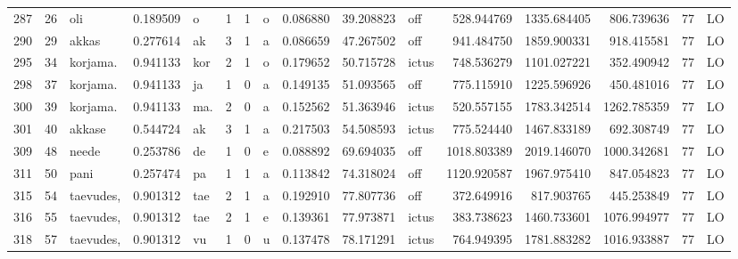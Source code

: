 \begin{tabular}{lrlrllllrrlrrrll}
287  &          26 &              oli &  0.189509 &       o &        1 &      1 &       o &      0.086880 &     39.208823 &    off &   528.944769 &  1335.684405 &   806.739636 &     77 &        LO \\
290  &          29 &            akkas &  0.277614 &      ak &        3 &      1 &       a &      0.086659 &     47.267502 &    off &   941.484750 &  1859.900331 &   918.415581 &     77 &        LO \\
295  &          34 &         korjama. &  0.941133 &     kor &        2 &      1 &       o &      0.179652 &     50.715728 &  ictus &   748.536279 &  1101.027221 &   352.490942 &     77 &        LO \\
298  &          37 &         korjama. &  0.941133 &      ja &        1 &      0 &       a &      0.149135 &     51.093565 &    off &   775.115910 &  1225.596926 &   450.481016 &     77 &        LO \\
300  &          39 &         korjama. &  0.941133 &     ma. &        2 &      0 &       a &      0.152562 &     51.363946 &  ictus &   520.557155 &  1783.342514 &  1262.785359 &     77 &        LO \\
301  &          40 &           akkase &  0.544724 &      ak &        3 &      1 &       a &      0.217503 &     54.508593 &  ictus &   775.524440 &  1467.833189 &   692.308749 &     77 &        LO \\
309  &          48 &            neede &  0.253786 &      de &        1 &      0 &       e &      0.088892 &     69.694035 &    off &  1018.803389 &  2019.146070 &  1000.342681 &     77 &        LO \\
311  &          50 &             pani &  0.257474 &      pa &        1 &      1 &       a &      0.113842 &     74.318024 &    off &  1120.920587 &  1967.975410 &   847.054823 &     77 &        LO \\
315  &          54 &        taevudes, &  0.901312 &     tae &        2 &      1 &       a &      0.192910 &     77.807736 &    off &   372.649916 &   817.903765 &   445.253849 &     77 &        LO \\
316  &          55 &        taevudes, &  0.901312 &     tae &        2 &      1 &       e &      0.139361 &     77.973871 &  ictus &   383.738623 &  1460.733601 &  1076.994977 &     77 &        LO \\
318  &          57 &        taevudes, &  0.901312 &      vu &        1 &      0 &       u &      0.137478 &     78.171291 &  ictus &   764.949395 &  1781.883282 &  1016.933887 &     77 &        LO \\

\end{tabular}
